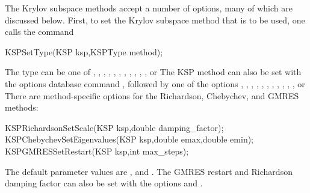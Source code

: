 The Krylov subspace methods accept a number of options, many of which 
are discussed below.  First, to set the Krylov subspace method that is to 
be used, one calls the command 
\begin{tabbing}
  KSPSetType(KSP ksp,KSPType method);
\end{tabbing}
The type can be one of , , , , 
, , , , , , , or 
  
   
  
The KSP method can also be set with the options database command 
,
followed by one of the options , , , , , 
, , , , , , or  
There are method-specific options for the Richardson, Chebychev,
and GMRES  
methods:    
\begin{tabbing}
  KSPRichardsonSetScale(KSP ksp,double damping\_factor);\\
  KSPChebychevSetEigenvalues(KSP ksp,double emax,double emin);\\
  KSPGMRESSetRestart(KSP ksp,int max\_steps);
\end{tabbing}
The default parameter values are , and . The GMRES 
 restart and Richardson damping factor
can also be set with the options 
and .  


